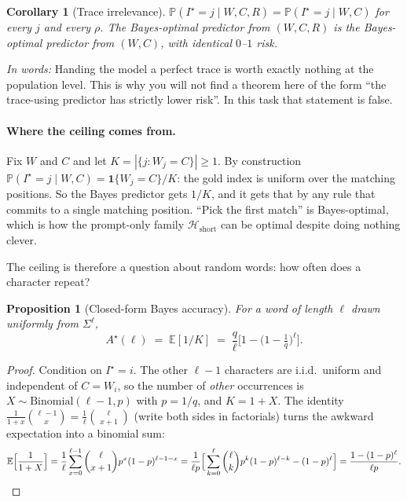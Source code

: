 \documentclass{article}
\theoremstyle{plain}
\newtheorem{proposition}{Proposition}
\newtheorem{corollary}{Corollary}
\theoremstyle{definition}
\theoremstyle{remark}
\newcommand{\E}{\mathbb{E}}
\newcommand{\Prob}{\mathbb{P}}
\newcommand{\1}{\mathbf{1}}
\newcommand{\cH}{\mathcal{H}}
\newcommand{\takeaway}[1]{%
  \par\medskip\noindent\textit{In words:} #1\par\medskip}
\begin{document}
\begin{corollary}[Trace irrelevance]
\label{cor:irrelevance}
$\Prob(I^\star = j\mid W,C,R) = \Prob(I^\star = j\mid W,C)$ for every $j$ and
every $\rho$. The Bayes-optimal predictor from $(W,C,R)$ is the Bayes-optimal
predictor from $(W,C)$, with identical $0$--$1$ risk.
\end{corollary}

\takeaway{Handing the model a perfect trace is worth exactly nothing at the
population level. This is why you will not find a theorem here of the form ``the
trace-using predictor has strictly lower risk''. In this task that statement is
false.}

\paragraph{Where the ceiling comes from.}
Fix $W$ and $C$ and let $K=|\{j:W_j=C\}|\ge1$. By construction
$\Prob(I^\star=j\mid W,C) = \1\{W_j=C\}/K$: the gold index is uniform over the
matching positions. So the Bayes predictor gets $1/K$, and it gets that by any
rule that commits to a single matching position. ``Pick the first match'' is
Bayes-optimal, which is how the prompt-only family $\cH_{\mathrm{short}}$ can be
optimal despite doing nothing clever.

The ceiling is therefore a question about random words: how often does a
character repeat?

\begin{proposition}[Closed-form Bayes accuracy]
\label{prop:bayesacc}
For a word of length $\ell$ drawn uniformly from $\Sigma^\ell$,
\begin{equation}
\label{eq:bayesacc}
A^\star(\ell) \;=\; \E[1/K] \;=\; \frac{q}{\ell}\Big[1 - \big(1-\tfrac1q\big)^{\ell}\Big].
\end{equation}
\end{proposition}

\begin{proof}
Condition on $I^\star = i$. The other $\ell-1$ characters are i.i.d.\ uniform and
independent of $C=W_i$, so the number of \emph{other} occurrences is
$X\sim\mathrm{Binomial}(\ell-1,p)$ with $p=1/q$, and $K=1+X$. The identity
$\frac{1}{1+x}\binom{\ell-1}{x} = \frac1\ell\binom{\ell}{x+1}$ (write both sides
in factorials) turns the awkward expectation into a binomial sum:
\[
\E\Big[\frac1{1+X}\Big]
= \frac1\ell\sum_{x=0}^{\ell-1}\binom{\ell}{x+1}p^{x}(1-p)^{\ell-1-x}
= \frac{1}{\ell p}\Big[\sum_{k=0}^{\ell}\binom{\ell}{k}p^{k}(1-p)^{\ell-k} - (1-p)^\ell\Big]
= \frac{1-(1-p)^{\ell}}{\ell p}.
\qedhere
\]
\end{proof}
\end{document}
